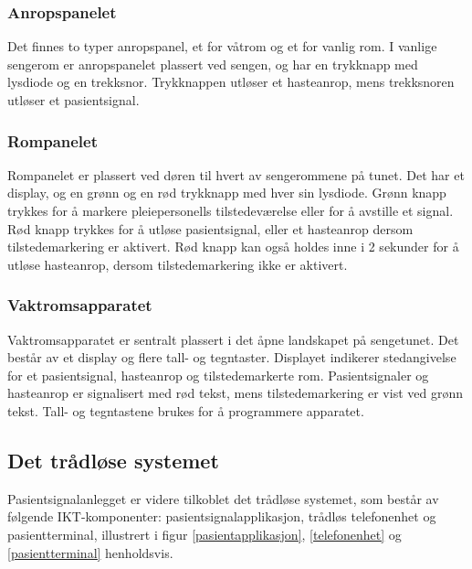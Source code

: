 \noindent
\subsubsection{Anropspanelet}
Det finnes to typer anropspanel, et for våtrom og et for vanlig rom. I vanlige sengerom er anropspanelet plassert ved sengen, og har en trykknapp med lysdiode og en trekksnor.
Trykknappen utløser et hasteanrop, mens trekksnoren utløser et pasientsignal.

\subsubsection{Rompanelet}
Rompanelet er plassert ved døren til hvert av sengerommene på tunet. Det har et display, og en grønn og en rød trykknapp med hver sin lysdiode. Grønn knapp trykkes for å markere pleiepersonells tilstedeværelse eller for å avstille et signal. Rød knapp trykkes for å utløse pasientsignal, eller et hasteanrop dersom tilstedemarkering er aktivert. Rød knapp kan også holdes inne i 2 sekunder for å utløse hasteanrop, dersom tilstedemarkering ikke er aktivert. 

\subsubsection{Vaktromsapparatet}
Vaktromsapparatet er sentralt plassert i det åpne landskapet på sengetunet. Det består av et display og flere tall- og tegntaster. Displayet indikerer stedangivelse for et pasientsignal, hasteanrop og tilstedemarkerte rom. Pasientsignaler og hasteanrop er signalisert med rød tekst, mens tilstedemarkering er vist ved grønn tekst. Tall- og tegntastene brukes for å programmere apparatet.

\subsection{Det trådløse systemet}
Pasientsignalanlegget er videre tilkoblet det trådløse systemet, som består av følgende IKT-komponenter: pasientsignalapplikasjon, trådløs telefonenhet og pasientterminal, illustrert i figur \ref{pasientapplikasjon}, \ref{telefonenhet} og \ref{pasientterminal} henholdsvis.

